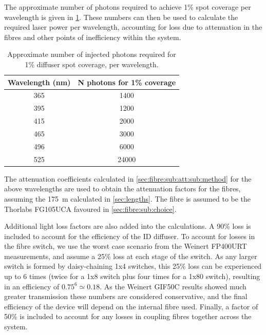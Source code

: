 \documentclass[a4paper,11pt]{article}
\begin{document}
The approximate number of photons required to achieve 1\% spot coverage per wavelength is given in \cref{tab:coverage}. These numbers can then be used to calculate the required laser power per wavelength, accounting for loss due to attenuation in the fibres and other points of inefficiency within the system.
\begin{table}[h]
\centering
\begin{tabular}{cc}
\hline
Wavelength (nm) & N photons for 1\% coverage \\ \hline
365 & 1400 \\
395 & 1200 \\
415 & 2000 \\
465 & 3000 \\
496 & 6000 \\
525 & 24000\\ \hline
\end{tabular}
\caption{Approximate number of injected photons required for 1\% diffuser spot coverage, per wavelength.}\label{tab:coverage}
\end{table}
The attenuation coefficients calculated in \cref{sec:fibre:sub:att:sub:method} for the above wavelengths are used to obtain the attenuation factors for the fibres, assuming the 175~m calculated in \cref{sec:lengths}. The fibre is assumed to be the Thorlabs FG105UCA favoured in \cref{sec:fibre:sub:choice}.

Additional light loss factors are also added into the calculations. A 90\% loss is included to account for the efficiency of the ID diffuser. To account for losses in the fibre switch, we use the worst case scenario from the Weinert FP400URT measurements, and assume a 25\% loss at each stage of the switch. As any larger switch is formed by daisy-chaining 1x4 switches, this 25\% loss can be experienced up to 6 times (twice for a 1x8 switch plus four times for a 1x80 switch), resulting in an efficiency of $0.75^6 \simeq 0.18$. As the Weinert GIF50C results showed much greater transmission these numbers are considered conservative, and the final efficiency of the device will depend on the internal fibre used. Finally, a factor of 50\% is included to account for any losses in coupling fibres together across the system.
\end{document}
